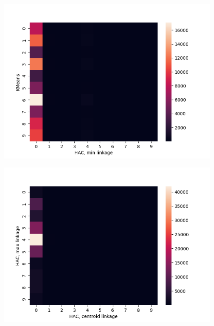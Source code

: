 \documentclass[submit]{harvardml}
\begin{document}
\begin{enumerate}
\newpage
\begin{figure}[h]
\includegraphics[width=\linewidth]{part6kmeansmin}
\end{figure}

\newpage
\begin{figure}[h]
\includegraphics[width=\linewidth]{part6maxcentroid}
\end{figure}


\end{enumerate}
\end{document}
